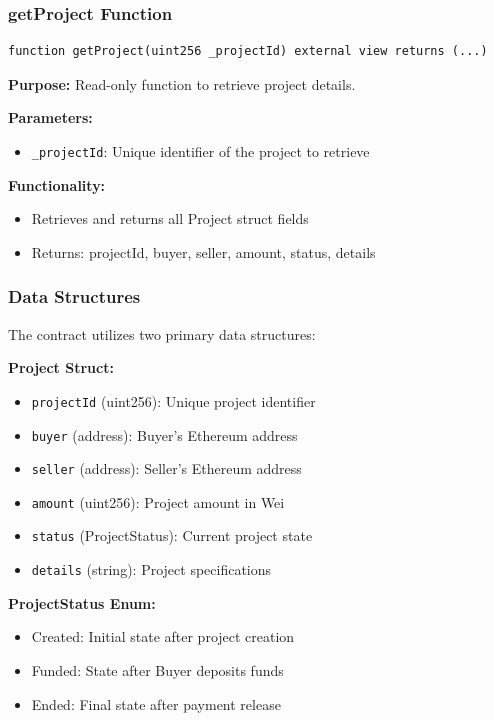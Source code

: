 \documentclass[12pt]{article}
\begin{document}
\subsubsection{getProject Function}
\begin{lstlisting}[language=Solidity]
function getProject(uint256 _projectId) external view returns (...)
\end{lstlisting}

\textbf{Purpose:} Read-only function to retrieve project details.

\textbf{Parameters:}
\begin{itemize}
    \item \texttt{\_projectId}: Unique identifier of the project to retrieve
\end{itemize}

\textbf{Functionality:}
\begin{itemize}
    \item Retrieves and returns all Project struct fields
    \item Returns: projectId, buyer, seller, amount, status, details
\end{itemize}

\subsubsection{Data Structures}
The contract utilizes two primary data structures:

\textbf{Project Struct:}
\begin{itemize}
    \item \texttt{projectId} (uint256): Unique project identifier
    \item \texttt{buyer} (address): Buyer's Ethereum address
    \item \texttt{seller} (address): Seller's Ethereum address
    \item \texttt{amount} (uint256): Project amount in Wei
    \item \texttt{status} (ProjectStatus): Current project state
    \item \texttt{details} (string): Project specifications
\end{itemize}

\textbf{ProjectStatus Enum:}
\begin{itemize}
    \item Created: Initial state after project creation
    \item Funded: State after Buyer deposits funds
    \item Ended: Final state after payment release
\end{itemize}
\end{document}
